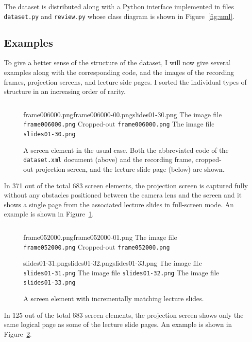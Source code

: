 The dataset is distributed along with a Python interface implemented in files
\texttt{dataset.py} and \texttt{review.py} whose class diagram is shown in
Figure~\ref{fig:uml}.

\subsection{Examples}
To give a better sense of the structure of the dataset, I will now give several
examples along with the corresponding  code, and the images of the
recording frames, projection screens, and lecture side pages. I sorted the
individual types of structure in an increasing order of rarity.

\begin{description}
  \begin{figure}
    \inputminted{xml}{fig/examples/normal/example.xml}\par
      {frame006000.png}{frame006000-00.png}{slides01-30.png}%
      {The image file \texttt{frame006000.png}}%
      {Cropped-out \texttt{frame006000.png}}%
      {The image file \texttt{slides01-30.png}}
    \caption{A screen element in the usual case. Both the abbreviated code
      of the \texttt{dataset.xml} document (above) and the recording frame,
      cropped-out projection screen, and the lecture slide page (below) are
      shown.}
    \label{fig:example-normal}
  \end{figure}
  \item[The usual case] In 371 out of the total 683 screen elements, the
    projection screen is captured fully without any obstacles positioned
    between the camera lens and the screen and it shows a single page from the
    associated lecture slides in full-screen mode. An example is shown in
    Figure~\ref{fig:example-normal}.

  \begin{figure}
    \inputminted{xml}{fig/examples/incremental/example.xml}\par
      {frame052000.png}{frame052000-01.png}%
      {The image file \texttt{frame052000.png}}%
      {Cropped-out \texttt{frame052000.png}}\par
      {slides01-31.png}{slides01-32.png}{slides01-33.png}%
      {The image file \texttt{slides01-31.png}}%
      {The image file \texttt{slides01-32.png}}%
      {The image file \texttt{slides01-33.png}}
    \caption{A screen element with incrementally matching lecture slides.}
    \label{fig:example-incremental}
  \end{figure}
  \item[Incremental matches] In 125 out of the total 683 screen elements,
    the projection screen shows only the same logical page as some of the
    lecture slide pages. An example is shown in
    Figure~\ref{fig:example-incremental}.


\end{description}
